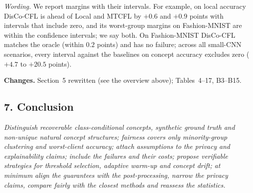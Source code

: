 \documentclass[11pt]{article}
\newenvironment{revcomment}{\par\medskip\noindent\begin{minipage}{\linewidth}\color{blue!45!black}\itshape}{\end{minipage}\par\smallskip}
\newcommand{\chg}{\par\noindent\textbf{Changes.} }
\begin{document}
\emph{Wording.} We report margins with their intervals. For example, on local accuracy DisCo-CFL is ahead of Local and MTCFL by $+0.6$ and $+0.9$ points with intervals that include zero, and its worst-group margins on Fashion-MNIST are within the confidence intervals; we say both. On Fashion-MNIST DisCo-CFL matches the oracle (within $0.2$ points) and has no failure; across all small-CNN scenarios, every interval against the baselines on concept accuracy excludes zero ($+4.7$ to $+20.5$ points).
\chg Section~5 rewritten (see the overview above); Tables~4--17, B3--B15.

\subsection*{7. Conclusion}
\begin{revcomment}
Distinguish recoverable class-conditional concepts, synthetic ground truth and non-unique natural concept structures; fairness covers only minority-group clustering and worst-client accuracy; attach assumptions to the privacy and explainability claims; include the failures and their costs; propose verifiable strategies for threshold selection, adaptive warm-up and concept drift; at minimum align the guarantees with the post-processing, narrow the privacy claims, compare fairly with the closest methods and reassess the statistics.
\end{revcomment}
\end{document}
